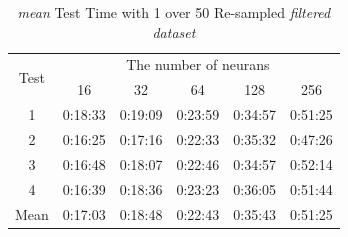 \documentclass[draft,dvipsnames]{drexel-thesis}
\begin{document}
\begin{thesis}
\begin{table}[!t]
\centering
\caption{{\em mean} Test Time with 1 over 50 Re-sampled {\em filtered dataset}}
\label{tbl:mean_1_50_time}
\begin{tabular}{|c|c|c|c|c|c|}
\hline
\multirow{2}{*}{Test}      & \multicolumn{5}{c|}{The number of neurans}                                                                                                               \\ \cline{2-6}
                           & 16                           & 32                           & 64                           & 128                          & 256                          \\ \hline
1                          & 0:18:33                      & 0:19:09                      & 0:23:59                      & 0:34:57                      & 0:51:25                      \\ \hline
2                          & 0:16:25                      & 0:17:16                      & 0:22:33                      & 0:35:32                      & 0:47:26                      \\ \hline
3                          & 0:16:48                      & 0:18:07                      & 0:22:46                      & 0:34:57                      & 0:52:14                      \\ \hline
4                          & 0:16:39                      & 0:18:36                      & 0:23:23                      & 0:36:05                      & 0:51:44                      \\ \hline
\multicolumn{1}{|l|}{Mean} & \multicolumn{1}{l|}{0:17:03} & \multicolumn{1}{l|}{0:18:48} & \multicolumn{1}{l|}{0:22:43} & \multicolumn{1}{l|}{0:35:43} & \multicolumn{1}{l|}{0:51:25} \\ \hline
\end{tabular}
\end{table}


\end{thesis}
\end{document}
